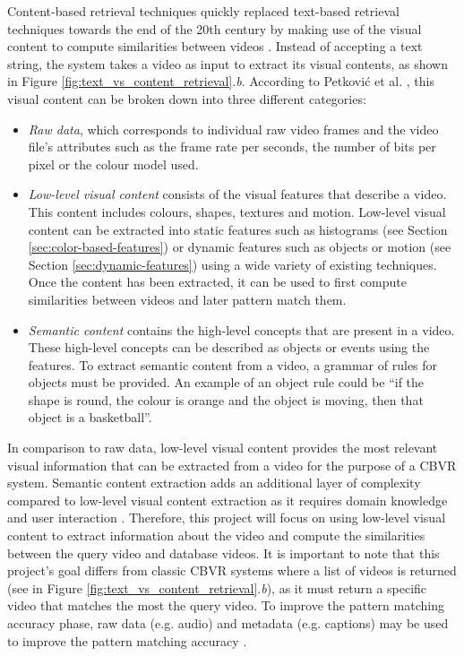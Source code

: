 Content-based retrieval techniques quickly replaced text-based retrieval techniques towards the end of the 20th century by making use of the visual content to compute similarities between videos \cite{lai2015trajectory}. Instead of accepting a text string, the system takes a video as input to extract its visual contents, as shown in Figure \ref{fig:text_vs_content_retrieval}.\emph{b}. According to Petković et al. \cite{petkovic2000}, this visual content can be broken down into three different categories:
\begin{itemize}
    \item \textit{Raw data}, which corresponds to individual raw video frames and the video file's attributes such as the frame rate per seconds, the number of bits per pixel or the colour model used.
    \item \textit{Low-level visual content}  consists of the visual features that describe a video. This content includes colours, shapes, textures and motion. Low-level visual content can be extracted into static features such as histograms (see Section \ref{sec:color-based-features}) or dynamic features such as objects or motion (see Section \ref{sec:dynamic-features}) using a wide variety of existing techniques. Once the content has been extracted, it can be used to first compute similarities between videos \cite{lai2015trajectory} and later pattern match them.
    \item \textit{Semantic content} contains the high-level concepts that are present in a video. These high-level concepts can be described as objects or events using the features. To extract semantic content from a video, a grammar of rules for objects must be provided. An example of an object rule could be ``if the shape is round, the colour is orange and the object is moving, then that object is a basketball''.
\end{itemize}

In comparison to raw data, low-level visual content provides the most relevant visual information that can be extracted from a video for the purpose of a CBVR system. Semantic content extraction adds an additional layer of complexity compared to low-level visual content extraction as it requires domain knowledge and user interaction \cite{petkovic2000}. Therefore, this project will focus on using low-level visual content to extract information about the video and compute the similarities between the query video and database videos. It is important to note that this project's goal differs from classic CBVR systems where a list of videos is returned (see in Figure \ref{fig:text_vs_content_retrieval}.\emph{b}), as it must return a specific video that matches the most the query video. To improve the pattern matching accuracy phase, raw data (e.g. audio) and metadata (e.g. captions) may be used to improve the pattern matching accuracy \cite{patel2012}.\\

